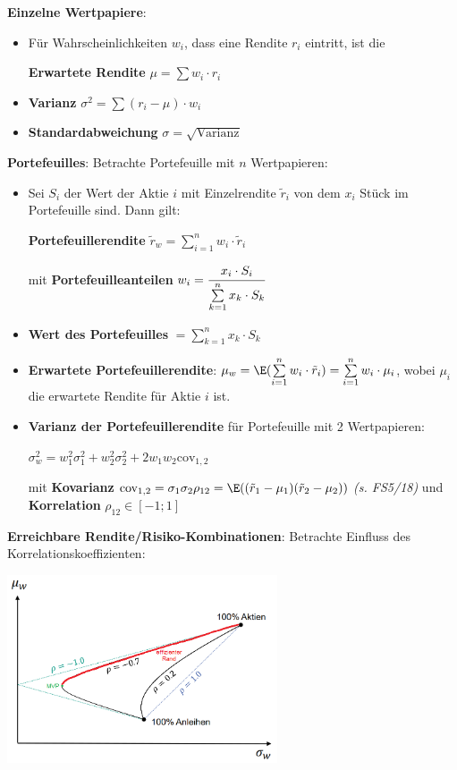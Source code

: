 \textbf{Einzelne Wertpapiere}:
\begin{itemize}
	\item Für Wahrscheinlichkeiten $w_i$, dass eine Rendite $r_i$ eintritt, ist die
	\begin{center}
		\textbf{Erwartete Rendite} $\mu=\sum w_i\cdot r_i$
	\end{center}
	\item \textbf{Varianz} $\sigma^2=\sum (r_i-\mu)\cdot w_i$
	\item \textbf{Standardabweichung} $\sigma=\sqrt{\text{Varianz}}$
\end{itemize}
\bigskip
\textbf{Portefeuilles}: Betrachte Portefeuille mit $n$ Wertpapieren:
\begin{itemize}
	\item Sei $S_i$ der Wert der Aktie $i$ mit Einzelrendite $\tilde{r}_i$ von dem $x_i$ Stück im Portefeuille sind. Dann gilt:
	\begin{center}
		\textbf{Portefeuillerendite} $\tilde{r}_w=\sum\limits_{i=1}^n w_i\cdot\tilde{r}_i$
	\end{center}
	mit \textbf{Portefeuilleanteilen} $w_i=\cfrac{x_i\cdot S_i}{\sum\limits_{k=1}^{n}x_k\cdot S_k}$
	\item \textbf{Wert des Portefeuilles} $=\sum\limits_{k=1}^{n}x_k\cdot S_k$
	\item \textbf{Erwartete Portefeuillerendite}: $\mu_w=\E(\sum\limits_{i=1}^n w_i\cdot\tilde{r}_i)=\sum\limits_{i=1}^n w_i\cdot\mu_i$, wobei $\mu_i$ die erwartete Rendite für Aktie $i$ ist.
	\item \textbf{Varianz der Portefeuillerendite} für Portefeuille mit 2 Wertpapieren: 
	\begin{center}
		$\sigma^2_w=w_1^2\sigma_1^2+w_2^2\sigma_2^2+2w_1w_2\text{cov}_{1,2}$
	\end{center}
	mit \textbf{Kovarianz} $\text{cov}_{1,2}=\sigma_1\sigma_2\rho_{12}=\E((\tilde{r}_1-\mu_1)(\tilde{r}_2-\mu_2))$ \textit{(s. FS5/18)} und\\
	\textbf{Korrelation} $\rho_{12}\in[-1;1]$
\end{itemize}
\bigskip
\textbf{Erreichbare Rendite/Risiko-Kombinationen}:
Betrachte Einfluss des Korrelationskoeffizienten:
\begin{center}
	\includegraphics[width=0.6\textwidth]{images/portefeuille.png}
\end{center}
